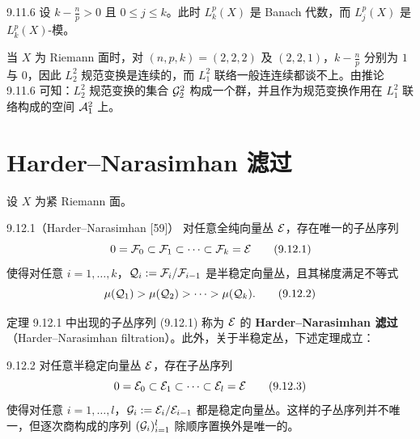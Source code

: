 

\begin{corollary}{9.11.6}
  设 $k-\frac np>0$ 且 $0\le j\le k$。此时 $L^p_k(X)$ 是 Banach 代数，而 $L^p_j(X)$ 是 $L^p_k(X)$-模。
\end{corollary}


当 $X$ 为 Riemann 面时，对 $(n,p,k)=(2,2,2)$ 及 $(2,2,1)$，$k-\frac np$ 分别为 $1$ 与 $0$，因此 $L^2_2$ 规范变换是连续的，而 $L^2_1$ 联络一般连连续都谈不上。由推论 9.11.6 可知：$L^2_2$ 规范变换的集合 $\mathcal{G}^2_2$ 构成一个群，并且作为规范变换作用在 $L^2_1$ 联络构成的空间 $\mathcal{A}^2_1$ 上。

\section{Harder--Narasimhan 滤过}


设 $X$ 为紧 Riemann 面。

\begin{theorem}{9.12.1（Harder--Narasimhan [59]）}
  对任意全纯向量丛 $\mathcal{E}$，存在唯一的子丛序列
  \begin{equation}
    0=\mathcal{F}_0\subset\mathcal{F}_1\subset\cdots\subset\mathcal{F}_k=\mathcal{E}
    \tag{9.12.1}
  \end{equation}
  使得对任意 $i=1,\dots,k$，$\mathcal{Q}_i:=\mathcal{F}_i/\mathcal{F}_{i-1}$ 是半稳定向量丛，且其梯度满足不等式
  \begin{equation}
    \mu(\mathcal{Q}_1)>\mu(\mathcal{Q}_2)>\cdots>\mu(\mathcal{Q}_k).
    \tag{9.12.2}
  \end{equation}
\end{theorem}

定理 9.12.1 中出现的子丛序列 (9.12.1) 称为 $\mathcal{E}$ 的 \textbf{Harder--Narasimhan 滤过}（Harder--Narasimhan filtration）。此外，关于半稳定丛，下述定理成立：

\begin{theorem}{9.12.2}
  对任意半稳定向量丛 $\mathcal{E}$，存在子丛序列
  \begin{equation}
    0=\mathcal{E}_0\subset\mathcal{E}_1\subset\cdots\subset\mathcal{E}_l=\mathcal{E}
    \tag{9.12.3}
  \end{equation}
  使得对任意 $i=1,\dots,l$，$\mathcal{G}_i:=\mathcal{E}_i/\mathcal{E}_{i-1}$ 都是稳定向量丛。这样的子丛序列并不唯一，但逐次商构成的序列 $(\mathcal{G}_i)_{i=1}^{l}$ 除顺序置换外是唯一的。
\end{theorem}

